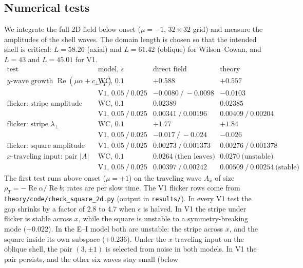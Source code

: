 \documentclass[11pt]{article}
\DeclareMathOperator{\RePart}{Re}
\begin{document}
\subsection{Numerical tests}
\label{sec:2d-tests}
We integrate the full 2D field below onset ($\mu=-1$, $32\times32$ grid) and
measure the amplitudes of the shell waves. The domain length is chosen so
that the intended shell is critical: $L=58.26$ (axial) and $L=61.42$
(oblique) for Wilson--Cowan, and $L=43$ and $L=45.01$ for V1.
{\small
\begin{equation*}
\begin{array}{l|l|cc}
 \text{test} & \text{model, }\epsilon & \text{direct field} & \text{theory}\\ \hline
 y\text{-wave growth }\RePart(\mu\alpha+c_\perp\rho_T) & \text{WC, }0.1 & +0.588 & +0.557\\
 & \text{V1, }0.05\ /\ 0.025 & -0.0080\ /\ -0.0098 & -0.0103\\
 \text{flicker: stripe amplitude} & \text{WC, }0.1 & 0.02389 & 0.02385\\
 & \text{V1, }0.05\ /\ 0.025 & 0.00341\ /\ 0.00196 & 0.00409\ /\ 0.00204\\
 \text{flicker: stripe }\lambda_\perp & \text{WC, }0.1 & +1.77 & +1.84\\
 & \text{V1, }0.05\ /\ 0.025 & -0.017\ /\ -0.024 & -0.026\\
 \text{flicker: square amplitude} & \text{V1, }0.05\ /\ 0.025 & 0.00273\ /\ 0.001373 & 0.00276\ /\ 0.001378\\
 x\text{-traveling input: pair }|A| & \text{WC, }0.1 & 0.0264\ \text{(then leaves)} & 0.0270\ \text{(unstable)}\\
 & \text{V1, }0.05\ /\ 0.025 & 0.00397\ /\ 0.00242 & 0.00509\ /\ 0.00254\ \text{(stable)}
\end{array}
\end{equation*}}
The first test runs above onset ($\mu=+1$) on the traveling wave $A_{\hat x}$ of
size $\rho_T=-\RePart\alpha/\RePart b$; rates are per slow time. The V1 flicker rows come from
\texttt{theory/code/check\_square\_2d.py} (output in \texttt{results/}). In every
V1 test the gap shrinks by a factor of 2.8 to 4.7 when $\epsilon$ is halved. In V1 the stripe under flicker is
stable across $x$, while the square is unstable to a symmetry-breaking mode
($+0.022$). In the E--I model both are unstable: the stripe across $x$, and
the square inside its own subspace ($+0.236$). Under the $x$-traveling input
on the oblique shell, the pair $(3,\pm1)$ is selected from noise in both
models. In V1 the pair persists, and the other six waves stay small (below
\end{document}
